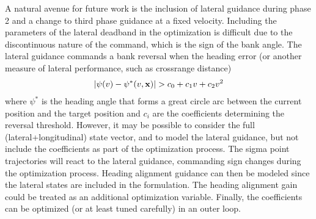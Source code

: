 A natural avenue for future work is the inclusion of lateral guidance during phase 2 and a change to third phase guidance at a fixed velocity. Including the parameters of the lateral deadband in the optimization is difficult due to the discontinuous nature of the command, which is the sign of the bank angle. The lateral guidance commands a bank reversal when the heading error (or another measure of lateral performance, such as crossrange distance) 
\begin{align}
|\psi(v)-\psi^*(v,\mathbf{x})| > c_0 + c_1v+c_2v^2
\end{align}
where $ \psi^* $ is the heading angle that forms a great circle arc between the current position and the target position and $c_i$ are the coefficients determining the reversal threshold. 
However, it may be possible to consider the full (lateral+longitudinal) state vector, and to model the lateral guidance, but not include the coefficients as part of the optimization process. The sigma point trajectories will react to the lateral guidance, commanding sign changes during the optimization process. Heading alignment guidance can then be modeled since the lateral states are included in the formulation. The heading alignment gain could be treated as an additional optimization variable. Finally, the coefficients can be optimized (or at least tuned carefully) in an outer loop.  

 

